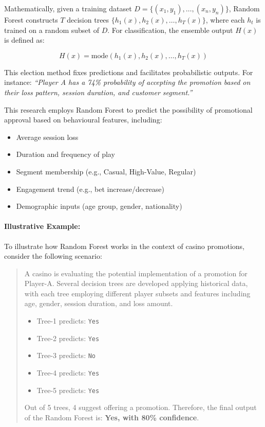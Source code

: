 \documentclass[12pt,a4paper]{report}
\begin{document}
Mathematically, given a training dataset \( D = \{(x_1, y_1), \dots, (x_n, y_n)\} \), Random Forest constructs \( T \) decision trees \( \{h_1(x), h_2(x), \dots, h_T(x)\} \), where each \( h_t \) is trained on a random subset of \( D \). For classification, the ensemble output \( H(x) \) is defined as:

\[
H(x) = \text{mode}\left( h_1(x), h_2(x), \dots, h_T(x) \right)
\]

This election method fixes predictions and facilitates probabilistic outputs. For instance:  
\textit{``Player A has a 74\% probability of accepting the promotion based on their loss pattern, session duration, and customer segment.''}

This research employs Random Forest to predict the possibility of promotional approval based on behavioural features, including:

\begin{itemize}
    \item Average session loss
    \item Duration and frequency of play
    \item Segment membership (e.g., Casual, High-Value, Regular)
    \item Engagement trend (e.g., bet increase/decrease)
    \item Demographic inputs (age group, gender, nationality)
\end{itemize}

\paragraph{Illustrative Example:}To illustrate how Random Forest works in the context of casino promotions, consider the following scenario:

\begin{quote}
    A casino is evaluating the potential implementation of a promotion for Player-A.  Several decision trees are developed applying historical data, with each tree employing different player subsets and features including age, gender, session duration, and loss amount.
    
    \begin{itemize}
        \item Tree-1 predicts: \texttt{Yes}
        \item Tree-2 predicts: \texttt{Yes}
        \item Tree-3 predicts: \texttt{No}
        \item Tree-4 predicts: \texttt{Yes}
        \item Tree-5 predicts: \texttt{Yes}
    \end{itemize}
    
    Out of 5 trees, 4 suggest offering a promotion. Therefore, the final output of the Random Forest is: \textbf{Yes, with 80\% confidence}.
\end{quote}
\end{document}

